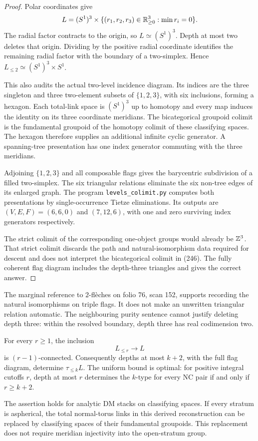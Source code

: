 \begin{proof}
Polar coordinates give
\[
 L=(S^1)^3\times
 \{(r_1,r_2,r_3)\in\mathbb R_{\geq0}^3:\min r_i=0\}.
\]
The radial factor contracts to the origin, so \(L\simeq(S^1)^3\).
Depth at most two deletes that origin. Dividing by the positive radial
coordinate identifies the remaining radial factor with the boundary
of a two-simplex. Hence \(L_{\leq2}\simeq(S^1)^3\times S^1\).

This also audits the actual two-level incidence diagram. Its indices
are the three singleton and three two-element subsets of
\(\{1,2,3\}\), with six inclusions, forming a hexagon. Each total-link
space is \((S^1)^3\) up to homotopy and every map induces the identity
on its three coordinate meridians. The bicategorical groupoid colimit
is the fundamental groupoid of the homotopy colimit of these classifying
spaces. The hexagon therefore supplies an additional infinite cyclic
generator. A spanning-tree presentation has one index generator commuting
with the three meridians.

Adjoining \(\{1,2,3\}\) and all composable flags gives the barycentric
subdivision of a filled two-simplex. The six triangular relations
eliminate the six non-tree edges of its enlarged graph.
The program \texttt{levels\_colimit.py} computes both presentations by
single-occurrence Tietze eliminations. Its outputs are
\((V,E,F)=(6,6,0)\) and \((7,12,6)\), with one and zero surviving
index generators respectively.

The strict colimit of the corresponding one-object groups would already
be \(\mathbb Z^3\). That strict colimit discards the path and natural-isomorphism
data required for descent and does not interpret the bicategorical
colimit in (246). The fully coherent flag diagram includes the
depth-three triangles and gives the correct answer.
\end{proof}

The marginal reference to \(2\)-fl\`eches on folio 76, scan 152,
supports recording the natural isomorphisms on triple flags. It does
not make an unwritten triangular relation automatic. The neighbouring
purity sentence cannot justify deleting depth three: within the
resolved boundary, depth three has real codimension two.

\begin{theorem}\label{P5a2}
For every \(r\geq1\), the inclusion
\[
                         L_{\leq r}\longrightarrow L
\]
is \((r-1)\)-connected. Consequently depths at most \(k+2\), with the
full flag diagram, determine \(\tau_{\leq k}L\). The uniform bound is
optimal: for positive integral cutoffs \(r\), depth at most \(r\)
determines the \(k\)-type for every NC pair if and only if \(r\geq k+2\).

The assertion holds for analytic DM stacks on classifying spaces.
If every stratum is aspherical, the total normal-torus links in this
derived reconstruction can be replaced by classifying spaces of
their fundamental groupoids. This replacement does not require
meridian injectivity into the open-stratum group.
\end{theorem}

